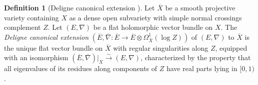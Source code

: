 \documentclass[12 pt]{amsart}
\theoremstyle{plain}
\theoremstyle{definition}
\newtheorem{definition}[subsubsection]{Definition}
\theoremstyle{remark}
\numberwithin{equation}{section}
\begin{document}
\begin{definition}[Deligne canonical extension ]
	   Let $\overline{X}$ be a smooth projective variety containing $X$ as a dense open subvariety with simple normal crossings complement $Z$.
   Let $(E, \nabla)$ be a flat holomorphic vector bundle on $X$. The \emph{Deligne canonical extension}
     $(\overline{E}, \overline{\nabla}: \overline{E}\to \overline{E}\otimes
     \Omega^1_{\overline{X}}(\log Z))$ of $(E, \nabla)$ to $\overline{X}$ is the
     unique flat vector bundle on $\overline{X}$ with regular singularities
     along $Z$, equipped with an isomorphism $(\overline{E},
     \overline{\nabla})|_X\overset{\sim}{\to}(E, \nabla)$, characterized by the
     property that all eigenvalues of its residues 
     along components of $Z$ 
     have real parts lying in $[0,1)$.
\end{definition}
\end{document}

